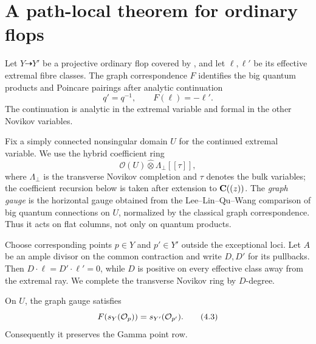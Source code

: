 \section{A path-local theorem for ordinary flops}
\label{sec:ordinary-flop}

Let \(Y\dashrightarrow Y'\) be a projective ordinary flop covered by
\cite{LeeLinQuWang}, and let \(\ell,\ell'\) be its effective extremal fibre
classes.  The graph correspondence \(F\) identifies the big quantum products
and Poincare pairings after analytic continuation
\[
 q'=q^{-1},\qquad F(\ell)=-\ell'.                         \tag{4.1}
\]
The continuation is analytic in the extremal variable and formal in the
other Novikov variables.

Fix a simply connected nonsingular domain \(U\) for the continued extremal
variable.  We use the hybrid coefficient ring
\[
 \mathcal O(U)\widehat\otimes\Lambda_{\perp}[[\tau]],       \tag{4.2}
\]
where \(\Lambda_{\perp}\) is the transverse Novikov completion and \(\tau\)
denotes the bulk variables; the coefficient recursion below is taken after
extension to \(\mathbf C((z))\).  The \emph{graph gauge} is the horizontal gauge
obtained from the Lee--Lin--Qu--Wang comparison of big quantum connections on
\(U\), normalized by the classical graph correspondence.  Thus it acts on
flat columns, not only on quantum products.

Choose corresponding points \(p\in Y\) and \(p'\in Y'\) outside the
exceptional loci.  Let \(A\) be an ample divisor on the common contraction
and write \(D,D'\) for its pullbacks.  Then
\(D\cdot\ell=D'\cdot\ell'=0\), while \(D\) is positive on every effective
class away from the extremal ray.  We complete the transverse Novikov ring
by \(D\)-degree.

\begin{theorem}
\label{thm:ordinary-flop-point-row}
On \(U\), the graph gauge satisfies
\[
 F(s_Y(\mathcal O_p))=s_{Y'}(\mathcal O_{p'}).                         \tag{4.3}
\]
Consequently it preserves the Gamma point row.
\end{theorem}

